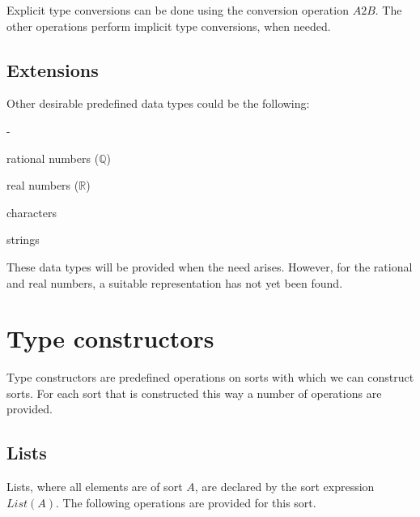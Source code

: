 \documentclass[a4paper,fleqn]{article}
\newenvironment{tdefinitions}[2][0.15em]
  {\begin{list}%
    {#2}%
    {\setlength{\parsep}{0pt}%
     \setlength{\itemsep}{#1}%
     \setlength{\leftmargin}{\mathindent}%
     \setlength{\labelwidth}{\mathindent - \labelsep}%
    }
  }
  {\end{list}}
\newcommand{\frm}[1]{\mbox{\ensuremath{#1}}}
\newcommand{\f}[1]{\ensuremath{\mathit{#1}}}
\newcommand{\fa}[2]{\ensuremath{\f{#1}(#2)}}
\newlength{\tlength}
\begin{document}
\noindent
Explicit type conversions can be done using the conversion operation \frm{\f{A2B}}. The other operations perform implicit type conversions, when needed.

\subsection{Extensions}

Other desirable predefined data types could be the following:
\begin{tdefinitions}{-}
\item rational numbers (\frm{\mathbb{Q}})
\item real numbers (\frm{\mathbb{R}})
\item characters
\item strings
\end{tdefinitions}

\noindent
These data types will be provided when the need arises. However, for the rational and real numbers, a suitable representation has not yet been found.

\section{Type constructors}
\label{sec:TypeConstructors}

Type constructors are predefined operations on sorts with which we can construct sorts. For each sort that is constructed this way a number of operations are provided.

\subsection{Lists}

Lists, where all elements are of sort \frm{A}, are declared by the sort expression \frm{\fa{List}{A}}. The following operations are provided for this sort.
\end{document}

